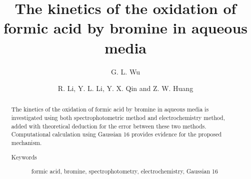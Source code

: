 \documentclass[%
preprint,
 amsmath,amssymb,
 aps,
10.5pt,
]{revtex4-1}
\begin{document}

\title{The kinetics of the oxidation of formic acid by bromine in aqueous media}%

\author{G. L. Wu}


\author{R. Li, Y. L. Li, Y. X. Qin and Z. W. Huang}
%





\begin{abstract}
The kinetics of the oxidation of formic acid by bromine in aqueous media is investigated using both spectrophotometric method and electrochemistry method, added with theoretical deduction for the error between these two methods. Computational calculation using Gaussian 16 provides evidence for the proposed mechanism.


\begin{description}
\item[Keywords] formic acid, bromine, spectrophotometry, electrochemistry, Gaussian 16

\end{description}
\end{abstract}

\maketitle
\end{document}
